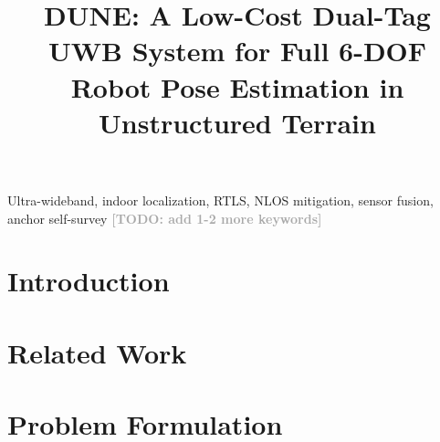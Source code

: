 \documentclass[letterpaper, 10pt, conference]{IEEEtran}
\newcommand{\todo}[1]{\textcolor{darkgray}{\textbf{[TODO: #1]}}}
\begin{document}
\title{DUNE: A Low-Cost Dual-Tag UWB System for Full 6-DOF Robot Pose Estimation
  in Unstructured Terrain}

\author{%
  \and
  \and
}

\maketitle

\begin{abstract}

\end{abstract}

\begin{IEEEkeywords}
Ultra-wideband, indoor localization, RTLS, NLOS mitigation, sensor fusion,
anchor self-survey \todo{add 1-2 more keywords}
\end{IEEEkeywords}

\section{Introduction}
\label{sec:intro}


\section{Related Work}
\label{sec:related}


\section{Problem Formulation}
\label{sec:problem}

\end{document}
